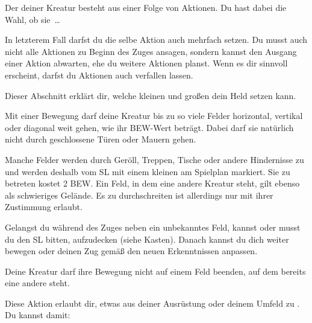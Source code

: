 {		Der  deiner Kreatur besteht aus einer Folge von Aktionen. Du hast dabei die Wahl, ob sie~\ldots


		\noindent
		In letzterem Fall darfst du die selbe Aktion auch mehrfach setzen. Du musst auch nicht alle Aktionen zu Beginn des Zuges ansagen, sondern kannst den Ausgang einer Aktion abwarten, ehe du weitere Aktionen planst. Wenn es dir sinnvoll erscheint, darfst du Aktionen auch verfallen lassen.


		\noindent
		Dieser Abschnitt erklärt dir, welche kleinen und großen  dein Held setzen kann.

			Mit einer Bewegung darf deine Kreatur bis zu so viele Felder horizontal, vertikal oder diagonal weit gehen, wie ihr BEW-Wert beträgt. Dabei darf sie natürlich nicht durch geschlossene Türen oder Mauern gehen.

			Manche Felder werden durch Geröll, Treppen, Tische oder andere Hindernisse zu  und werden deshalb vom SL mit einem kleinen  am Spielplan markiert. Sie zu betreten kostet 2 BEW. Ein Feld, in dem eine andere Kreatur steht, gilt ebenso als schwieriges Gelände. Es zu durchschreiten ist allerdings nur mit ihrer Zustimmung erlaubt.

			Gelangst du während des Zuges neben ein unbekanntes Feld, kannst oder musst du den SL bitten, aufzudecken (siehe Kasten). Danach kannst du dich weiter bewegen oder deinen Zug gemäß den neuen Erkenntnissen anpassen.

			Deine Kreatur darf ihre Bewegung nicht auf einem Feld beenden, auf dem bereits eine andere steht.

			Diese Aktion erlaubt dir, etwas aus deiner Ausrüstung oder deinem Umfeld zu . Du kannst damit:


}
